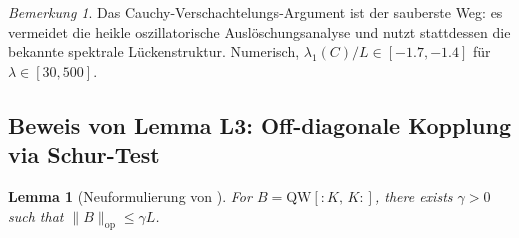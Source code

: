\documentclass[12pt,a4paper]{article}
\newtheorem{lemma}[theorem]{Lemma}
\theoremstyle{definition}
\theoremstyle{remark}
\newtheorem{remark}[theorem]{Bemerkung}
\begin{document}
\begin{remark}
Das Cauchy-Verschachtelungs-Argument ist der sauberste Weg: es vermeidet die heikle oszillatorische Auslöschungsanalyse und nutzt stattdessen die bekannte spektrale Lückenstruktur. Numerisch, $\lambda_1(C)/L \in [-1.7, -1.4]$ für $\lambda \in [30, 500]$.
\end{remark}

\subsection{Beweis von Lemma L3: Off-diagonale Kopplung via Schur-Test}

\begin{lemma}[Neuformulierung von ]
For $B = \mathrm{QW}[{:}K,\,K{:}]$, there exists $\gamma > 0$ such that $\|B\|_{\mathrm{op}} \leq \gamma L$.
\end{lemma}
\end{document}
